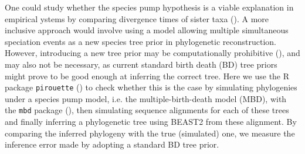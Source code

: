 One could study whether the species pump hypothesis is a viable explanation in empirical ystems by comparing divergence times of sister taxa (\citep{oaks2019comparative}). A more inclusive approach would involve using a model allowing multiple simultaneous speciation events as a new species tree prior in phylogenetic reconstruction. However, introducing a new tree prior may be computationally prohibitive (\citep{bilderbeek2019pirouette}), and may also not be necessary, as current standard birth death (BD) tree priors might prove to be good enough at inferring the correct tree. Here we use the R package \verb;pirouette; (\citep{pirouette}) to check whether this is the case by simulating phylogenies under a species pump model, i.e. the multiple-birth-death model (MBD), with the \verb;mbd; package (\citep{mbd}), then simulating sequence alignments for each of these trees and finally inferring a phylogenetic tree using BEAST2 from these alignment. By comparing the inferred phylogeny with the true (simulated) one, we measure the inference error made by adopting a standard BD tree prior.